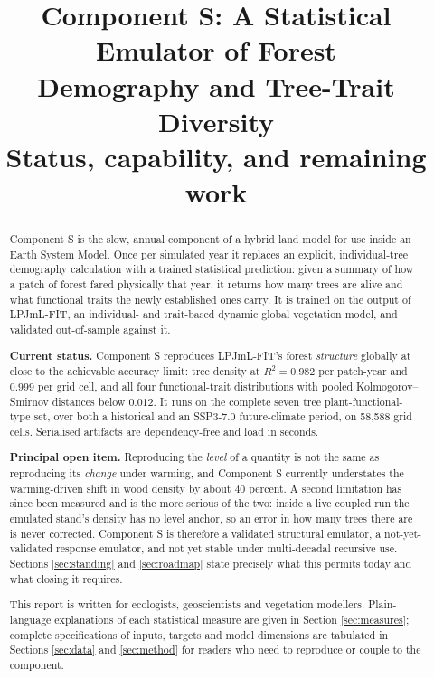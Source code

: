 \documentclass[11pt]{article}
\title{\textbf{Component S: A Statistical Emulator of Forest\\ Demography and Tree-Trait Diversity}\\
\large Status, capability, and remaining work}
\author{}
\date{}
\begin{document}
\maketitle

\begin{abstract}
\noindent
Component S is the slow, annual component of a hybrid land model for use inside an Earth System Model. Once per simulated year it replaces an explicit, individual-tree demography calculation with a trained statistical prediction: given a summary of how a patch of forest fared physically that year, it returns how many trees are alive and what functional traits the newly established ones carry. It is trained on the output of LPJmL-FIT, an individual- and trait-based dynamic global vegetation model, and validated out-of-sample against it.

\textbf{Current status.} Component S reproduces LPJmL-FIT's forest \emph{structure} globally at close to the achievable accuracy limit: tree density at $R^2 = 0.982$ per patch-year and $0.999$ per grid cell, and all four functional-trait distributions with pooled Kolmogorov--Smirnov distances below $0.012$. It runs on the complete seven tree plant-functional-type set, over both a historical and an SSP3-7.0 future-climate period, on 58{,}588 grid cells. Serialised artifacts are dependency-free and load in seconds.

\textbf{Principal open item.} Reproducing the \emph{level} of a quantity is not the same as reproducing its \emph{change} under warming, and Component S currently understates the warming-driven shift in wood density by about 40 percent. A second limitation has since been measured and is the more serious of the two: inside a live coupled run the emulated stand's density has no level anchor, so an error in how many trees there are is never corrected. Component S is therefore a validated structural emulator, a not-yet-validated response emulator, and not yet stable under multi-decadal recursive use. Sections \ref{sec:standing} and \ref{sec:roadmap} state precisely what this permits today and what closing it requires.

This report is written for ecologists, geoscientists and vegetation modellers. Plain-language explanations of each statistical measure are given in Section \ref{sec:measures}; complete specifications of inputs, targets and model dimensions are tabulated in Sections \ref{sec:data} and \ref{sec:method} for readers who need to reproduce or couple to the component.
\end{abstract}
\end{document}
